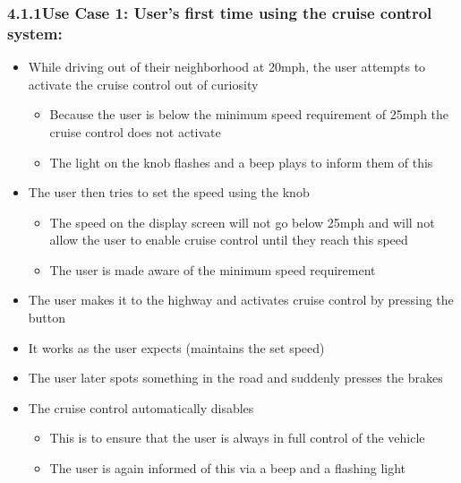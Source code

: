 \documentclass{article}
\begin{document}
	\subsubsection*{4.1.1\quad Use Case 1: User's first time using the cruise control system:}
	\begin{itemize}
		\item While driving out of their neighborhood at 20mph, the user attempts to activate the cruise control out of curiosity
		\begin{itemize}
			\item Because the user is below the minimum speed requirement of 25mph the cruise control does not activate
			\item The light on the knob flashes and a beep plays to inform them of this
		\end{itemize}
		\item The user then tries to set the speed using the knob
		\begin{itemize}
			\item The speed on the display screen will not go below 25mph and will not allow the user to enable cruise control until they reach this speed
			\item The user is made aware of the minimum speed requirement
		\end{itemize}
		\item The user makes it to the highway and activates cruise control by pressing the button
		\item It works as the user expects (maintains the set speed)
		\item The user later spots something in the road and suddenly presses the brakes
		\item The cruise control automatically disables
		\begin{itemize}
			\item This is to ensure that the user is always in full control of the vehicle
			\item The user is again informed of this via a beep and a flashing light
		\end{itemize}
	\end{itemize}
	
\end{document}
